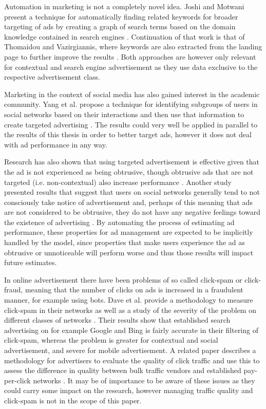 \documentclass{sig-alternate}
\begin{document}
Automation in marketing is not a completely novel idea. Joshi and Motwani present a technique for automatically finding related keywords for broader targeting of ads by creating a graph of search terms based on the domain knowledge contained in search engines \cite{Joshi2006}. Continuation of that work is that of Thomaidou and Vazirgiannis, where keywords are also extracted from the landing page to further improve the results \cite{Thomaidou2011}. Both approaches are however only relevant for contextual and search engine advertisement as they use data exclusive to the respective advertisement class.

Marketing in the context of social media has also gained interest in the academic community. Yang et al. propose a technique for identifying subgroups of users in social networks based on their interactions and then use that information to create targeted advertising \cite{Yang2006}. The results could very well be applied in parallel to the results of this thesis in order to better target ads, however it does not deal with ad performance in any way.

Research has also shown that using targeted advertisement is effective given that the ad is not experienced as being obtrusive, though obtrusive ads that are not targeted (i.e. non-contextual) also increase performance \citep{Goldfarb2011}. Another study presented results that suggest that users on social networks generally tend to not consciously take notice of advertisement and, perhaps of this meaning that ads are not considered to be obtrusive, they do not have any negative feelings toward the existence of advertising \citep{Hadija2012}. By automating the process of estimating ad performance, these properties for ad management are expected to be implicitly handled by the model, since properties that make users experience the ad as obtrusive or unnoticeable will perform worse and thus those results will impact future estimates.

In online advertisement there have been problems of so called click-spam or click-fraud, meaning that the number of clicks on ads is increased in a fraudulent manner, for example using bots. Dave et al. provide a methodology to measure click-spam in their networks as well as a study of the severity of the problem on different classes of networks \cite{Dave2012}. Their results show that established search advertising on for example Google and Bing is fairly accurate in their filtering of click-spam, whereas the problem is greater for contextual and social advertisement, and severe for mobile advertisement. A related paper describes a methodology for advertisers to evaluate the quality of click traffic and use this to assess the difference in quality between bulk traffic vendors and established pay-per-click networks \cite{Zhang2011}. It may be of importance to be aware of these issues as they could carry some impact on the research, however managing traffic quality and click-spam is not in the scope of this paper.
\end{document}

